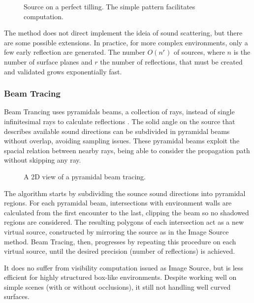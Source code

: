 \begin{figure}[h]
	\centering
	
	\caption{Source on a perfect tilling. The simple pattern facilitates
	computation.}
	\label{fig:tillingsource}
\end{figure}

The method does not direct implement the ideia of sound scattering, but there
are some possible extensions\cite{chandak2011fast}. In practice, for more
complex environments, only a few early reflection are generated. The number
$O(n^r)$ of sources, where $n$ is the number of surface planes and $r$ the
number of reflections, that must be created and validated grows exponentially
fast.

\subsubsection{Beam Tracing}

Beam Trancing uses pyramidals beams, a collection of rays, instead of single
infinitesimal rays to calculate reflections \cite{funkhouser2003survey}. The
solid angle on the source that describes available sound directions can be
subdivided in pyramidal beams without overlap, avoiding sampling issues. These
pyramidal beams exploit the spacial relation between nearby rays, being able to
consider the propagation path without skipping any ray.

\begin{figure}[h]
	\centering
	
	\caption{A 2D view of a pyramidal beam tracing.}
	\label{fig:beamtrace}
\end{figure}

The algorithm starts by subdividing the sounce sound directions into pyramidal
regions. For each pyramidal beam, intersections with environment walls are
calculated from the first encounter to the last, clipping the beam so no
shadowed regions are considered. The resulting polygons of each intersection act
as a new virtual source, constructed by mirroring the source as in the Image
Source method. Beam Tracing, then, progresses by repeating this procedure on
each virtual source, until the desired precision (number of reflections) is
achieved.

It does no suffer from visibility computation issued as Image Source, but is
less efficient for highly structured box-like environments. Despite working well
on simple scenes (with or without occlusions), it still not handling well
curved surfaces.


